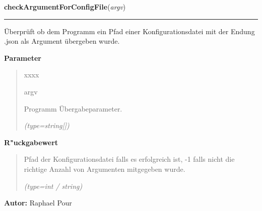 \hspace{.8\funcindent}\begin{boxedminipage}{\funcwidth}

    \raggedright \textbf{checkArgumentForConfigFile}(\textit{argv})

    \vspace{-1.5ex}

    \rule{\textwidth}{0.5\fboxrule}
\setlength{\parskip}{2ex}
    Überprüft ob dem Programm ein Pfad einer Konfigurationsdatei mit der 
    Endung .json als Argument übergeben wurde.

\setlength{\parskip}{1ex}
      \textbf{Parameter}
      \vspace{-1ex}

      \begin{quote}
        \begin{Ventry}{xxxx}

          \item[argv]

          Programm Übergabeparameter.

            {\it (type=string[])}

        \end{Ventry}

      \end{quote}

      \textbf{R"uckgabewert}
    \vspace{-1ex}

      \begin{quote}
      Pfad der Konfigurationsdatei falls es erfolgreich ist, -1 falls nicht
      die richtige Anzahl von Argumenten mitgegeben wurde.

      {\it (type=int / string)}

      \end{quote}

\textbf{Autor:} Raphael Pour



    \end{boxedminipage}

    \label{ledleuchtturm:fileFunc:configFileExists}

    \vspace{0.5ex}

